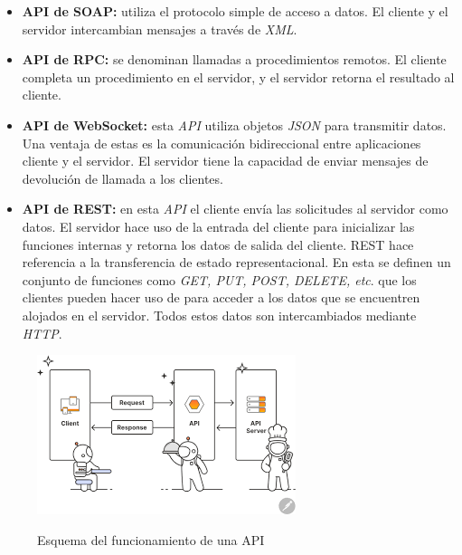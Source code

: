 \begin{itemize}
    \item \textbf{API de SOAP:} utiliza el protocolo simple de acceso a datos. El cliente y el servidor intercambian mensajes a través de \textit{XML}.
    
    \item \textbf{API de RPC:} se denominan llamadas a procedimientos remotos. El cliente completa un procedimiento en el servidor, y el servidor retorna el resultado al cliente.
    
    \item \textbf{API de WebSocket:} esta \textit{API} utiliza objetos \textit{JSON} para transmitir datos. Una ventaja de estas es la comunicación bidireccional entre aplicaciones cliente y el servidor. El servidor tiene la capacidad de enviar mensajes de devolución de llamada a los clientes.
    
    \item \textbf{API de REST:} en esta \textit{API} el cliente envía las solicitudes al servidor como datos. El servidor hace uso de la entrada del cliente para inicializar las funciones internas y retorna los datos de salida del cliente.
    REST hace referencia a la transferencia de estado representacional. En esta se definen un conjunto de funciones como \textit{GET, PUT, POST, DELETE, etc}. que los clientes pueden hacer uso de para acceder a los datos que se encuentren alojados en el servidor. Todos estos datos son intercambiados mediante \textit{HTTP}.
\end{itemize}

\begin{figure}[H]
    \centering
    {\includegraphics[width=0.7\linewidth]{img/funcionamiento_api.png}}
     {\caption{Esquema del funcionamiento de una API}
     \label{fig:funcionamiento_api}}
\end{figure}

